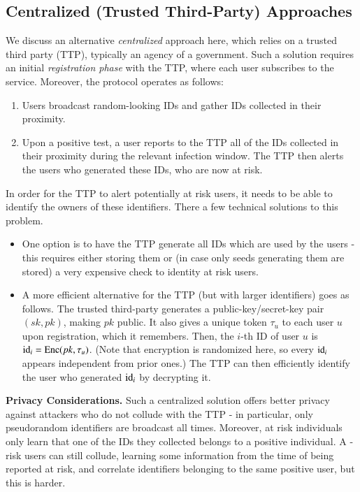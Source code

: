 \documentclass{article}
\begin{document}
\subsection{Centralized (Trusted Third-Party) Approaches}\label{sect:centr}

We discuss an alternative {\em centralized} approach here, which relies on a trusted third party (TTP), typically an agency of a government. Such a solution requires an initial {\em registration phase} with the TTP, where each user subscribes to the service. Moreover, the protocol operates as follows:
\begin{enumerate}    
\item Users broadcast random-looking IDs and gather IDs collected in their proximity. 
\item Upon a positive test, a user reports to the TTP all of the IDs collected in their proximity during the relevant infection window. The TTP then alerts the users who generated these IDs, who are now at risk.
\end{enumerate}
In order for the TTP to alert potentially at risk users, it needs to be able to identify the owners of these identifiers. There a few technical solutions to this problem. 
\begin{itemize}
\item One option is to have the TTP generate all IDs which are used by the users - this requires either storing them or (in case only seeds generating them are stored) a very expensive check to identity at risk users.
\item A more efficient alternative for the TTP (but with larger identifiers) goes as follows. The trusted third-party generates a public-key/secret-key pair $(sk, pk)$, making $pk$ public. It also gives a unique token $\tau_u$ to each user $u$ upon registration, which it remembers. Then, the $i$-th ID of user $u$ is $\mathrm{id}_i = \mathrm{Enc}(pk,\tau_u)$. (Note that encryption is randomized here, so every $\mathrm{id}_i$ appears independent from prior ones.) The TTP can then efficiently identify the user who generated $\mathrm{id}_i$ by decrypting it. 
\end{itemize}

{\bf Privacy Considerations.} Such a centralized solution offers better privacy against attackers who do not collude with the TTP - in particular, only pseudorandom identifiers are broadcast all times. Moreover, at risk individuals only learn that one of the IDs they collected belongs to a positive individual. A -risk users can still collude, learning some information from the time of being reported at risk, and correlate identifiers belonging to the same positive user, but this is harder.  
\end{document}
